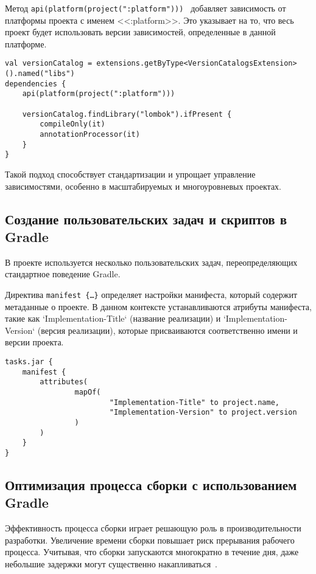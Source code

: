 Метод \texttt{api(platform(project(":platform"))) } добавляет зависимость от платформы проекта с именем <<:platform>>.
Это указывает на то, что весь проект будет использовать версии зависимостей, определенные в данной платформе.

\begin{lstlisting}
val versionCatalog = extensions.getByType<VersionCatalogsExtension>().named("libs")
dependencies {
    api(platform(project(":platform")))

    versionCatalog.findLibrary("lombok").ifPresent {
        compileOnly(it)
        annotationProcessor(it)
    }
}
\end{lstlisting}

Такой подход способствует стандартизации и упрощает управление зависимостями, особенно в масштабируемых и многоуровневых проектах.

\subsection{Создание пользовательских задач и скриптов в Gradle}

В проекте используется несколько пользовательских задач, переопределяющих стандартное поведение Gradle.

Директива \texttt{manifest \{\ldots \}} определяет настройки манифеста, который содержит метаданные о проекте.
В данном контексте устанавливаются атрибуты манифеста, такие как `Implementation-Title` (название реализации) и `Implementation-Version` (версия реализации), которые присваиваются соответственно имени и версии проекта.

\begin{lstlisting}
tasks.jar {
    manifest {
        attributes(
                mapOf(
                        "Implementation-Title" to project.name,
                        "Implementation-Version" to project.version
                )
        )
    }
}
\end{lstlisting}

\subsection{Оптимизация процесса сборки с использованием Gradle}

Эффективность процесса сборки играет решающую роль в производительности разработки.
Увеличение
времени сборки повышает риск прерывания рабочего процесса.
Учитывая, что сборки запускаются
многократно в течение дня, даже небольшие задержки могут существенно
накапливаться~\cite{gradle_perfomance}.


